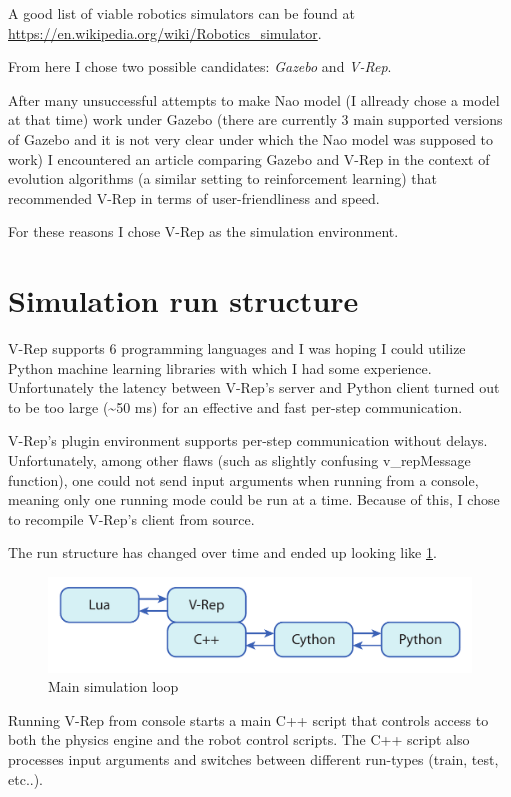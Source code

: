 A good list of viable robotics simulators can be found at \url{https://en.wikipedia.org/wiki/Robotics_simulator}.

From here I chose two possible candidates: \textit{Gazebo} and \textit{V-Rep}.

After many unsuccessful attempts to make Nao model (I allready chose a model at that time) work under Gazebo (there are currently 3 main supported versions of Gazebo and it is not very clear under which the Nao model was supposed to work) I encountered an article \cite{cite:gazebo-vrep} comparing Gazebo and V-Rep in the context of evolution algorithms (a similar setting to reinforcement learning) that recommended V-Rep in terms of user-friendliness and speed.

For these reasons I chose V-Rep as the simulation environment.

\section{Simulation run structure}
V-Rep supports 6 programming languages and I was hoping I could utilize Python machine learning libraries with which I had some experience. Unfortunately the latency between V-Rep's server and Python client turned out to be too large (\textasciitilde 50 ms) for an effective and fast per-step communication.

V-Rep's plugin environment supports per-step communication without delays. Unfortunately, among other flaws (such as slightly confusing v\_repMessage function), one could not send input arguments when running from a console, meaning only one running mode could be run at a time. Because of this, I chose to recompile V-Rep's client from source.

The run structure has changed over time and ended up looking like \ref{fig:langs}.


\begin{figure}
\includegraphics[width=\textwidth]{images/robsim/impl_loop.pdf}
\caption{Main simulation loop}
\label{fig:langs}
\end{figure}

Running V-Rep from console starts a main C++ script that controls access to both the physics engine and the robot control scripts. The C++ script also processes input arguments and switches between different run-types (train, test, etc..).

